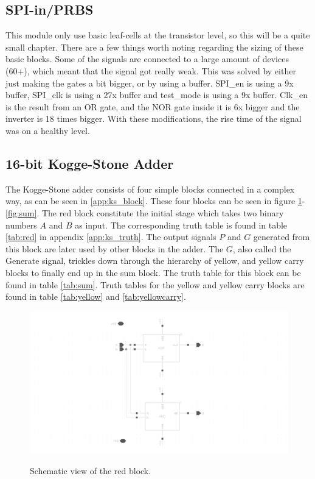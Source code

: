 
\subsection{SPI-in/PRBS}
This module only use basic leaf-cells at the transistor level, so this will be a quite small chapter. There are a few things worth noting regarding the sizing of these basic blocks. Some of the signals are connected to a large amount of devices (60+), which meant that the signal got really weak. This was solved by either just making the gates a bit bigger, or by using a buffer. SPI\_en is using a 9x buffer, SPI\_clk is using a 27x buffer and test\_mode is using a 9x buffer. Clk\_en is the result from an OR gate, and the NOR gate inside it is 6x bigger and the inverter is 18 times bigger. With these modifications, the rise time of the signal was on a healthy level.

\subsection{16-bit Kogge-Stone Adder}
The Kogge-Stone adder consists of four simple blocks connected in a complex way, as can be seen in \ref{app:ks_block}. These four blocks can be seen in figure \ref{fig:red}-\ref{fig:sum}. The red block constitute the initial stage which takes two binary numbers $A$ and $B$ as input. The corresponding truth table is found in table \ref{tab:red} in appendix \ref{app:ks_truth}. The output signals $P$ and $G$ generated from this block are later used by other blocks in the adder. The $G$, also called the Generate signal, trickles down through the hierarchy of yellow, and yellow carry blocks to finally end up in the sum block. The truth table for this block can be found in table \ref{tab:sum}. Truth tables for the yellow and yellow carry blocks are found in table \ref{tab:yellow} and \ref{tab:yellowcarry}.

\begin{figure}[H]
  \centering
  \captionsetup{justification=centering}
  {\includegraphics[width=2.0\textwidth]{../figures/red}}
  \caption{Schematic view of the red block.} \label{fig:red}
\end{figure}

